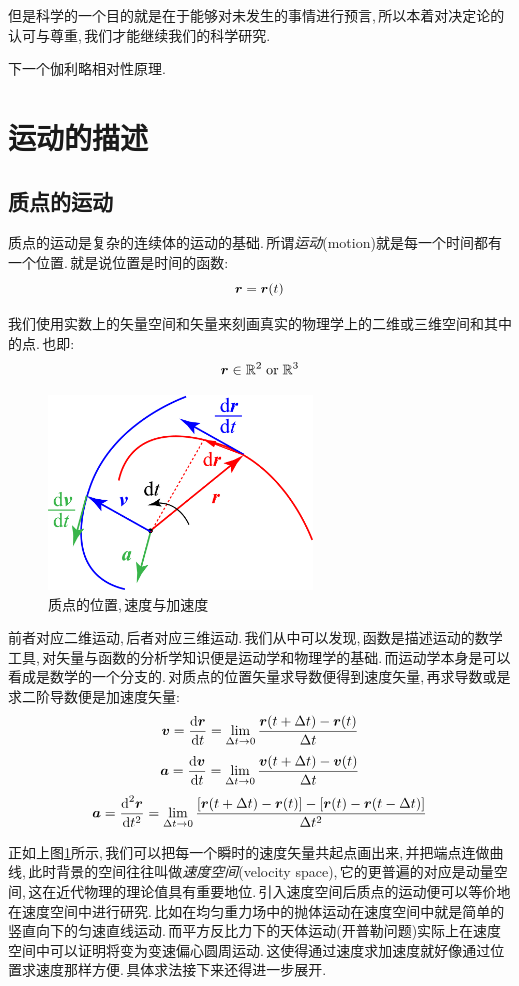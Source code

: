但是科学的一个目的就是在于能够对未发生的事情进行预言,\,所以本着对决定论的认可与尊重,\,我们才能继续我们的科学研究.

下一个伽利略相对性原理.
\vspace{5cm}



\section{运动的描述}

\subsection{质点的运动}
质点的运动是复杂的连续体的运动的基础.\,所谓\emph{运动}(motion)就是每一个时间都有一个位置.\,就是说位置是时间的函数:
\[\boldsymbol{r}=\boldsymbol{r}(t)\]

我们使用实数上的矢量空间和矢量来刻画真实的物理学上的二维或三维空间和其中的点.\,也即:
\[\boldsymbol{r}\in\mathbb{R}^2 \;{\rm or}\; \mathbb{R}^3\]

\begin{figure}\label{6-1-3}
\vspace{-0.4cm}
\centering
\includegraphics[width=7cm]{image/6-1-3.png}
\caption{质点的位置,\,速度与加速度}
\end{figure}
前者对应二维运动,\,后者对应三维运动.\,我们从中可以发现,\,函数是描述运动的数学工具,\,对矢量与函数的分析学知识便是运动学和物理学的基础.\,而运动学本身是可以看成是数学的一个分支的.\,对质点的位置矢量求导数便得到速度矢量,\,再求导数或是求二阶导数便是加速度矢量:
\[\boldsymbol{v}=\frac{\textrm{d} \boldsymbol{r}}{\textrm{d} t}=\lim_{\Delta t\to 0 }\frac{\boldsymbol{r}(t+\Delta t)-\boldsymbol{r}(t)}{\Delta t}\]
\[\boldsymbol{a}=\frac{\textrm{d} \boldsymbol{v}}{\textrm{d} t}=\lim_{\Delta t\to 0 }\frac{\boldsymbol{v}(t+\Delta t)-\boldsymbol{v}(t)}{\Delta t}\]
\[\boldsymbol{a}=\frac{\textrm{d} ^2\boldsymbol{r}}{\textrm{d} t^2}=\lim_{\Delta t\to 0 }\frac{[\boldsymbol{r}(t+\Delta t)-\boldsymbol{r}(t)]-[\boldsymbol{r}(t)-\boldsymbol{r}(t-\Delta t)]}{\Delta t^2}\]

正如上图\ref{6-1-3}所示,\,我们可以把每一个瞬时的速度矢量共起点画出来,\,并把端点连做曲线,\,此时背景的空间往往叫做\emph{速度空间}(velocity space),\,它的更普遍的对应是动量空间,\,这在近代物理的理论值具有重要地位.\,引入速度空间后质点的运动便可以等价地在速度空间中进行研究.\,比如在均匀重力场中的抛体运动在速度空间中就是简单的竖直向下的匀速直线运动.\,而平方反比力下的天体运动(开普勒问题)实际上在速度空间中可以证明将变为变速偏心圆周运动.\,这使得通过速度求加速度就好像通过位置求速度那样方便.\,具体求法接下来还得进一步展开.

